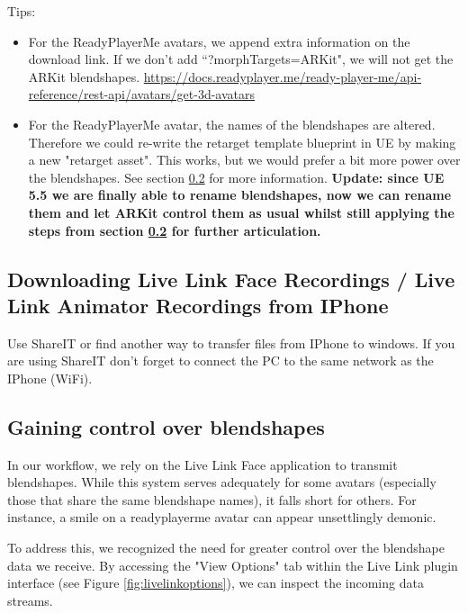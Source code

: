 \documentclass{uva-inf-article}
\begin{document}
Tips:
\begin{itemize}
    \item For the ReadyPlayerMe avatars, we append extra information on the download link. If we don't add ``?morphTargets=ARKit", we will not get the ARKit blendshapes.
    \url{https://docs.readyplayer.me/ready-player-me/api-reference/rest-api/avatars/get-3d-avatars}
    \item For the ReadyPlayerMe avatar, the names of the blendshapes are altered. Therefore we could re-write the retarget template blueprint in UE by making a new "retarget asset". This works, but we would prefer a bit more power over the blendshapes. See section \ref{blendshapescontrol} for more information. \textbf{Update: since UE 5.5 we are finally able to rename blendshapes, now we can rename them and let ARKit control them as usual whilst still applying the steps from section \ref{blendshapescontrol} for further articulation.}
\end{itemize}

\subsection{Downloading Live Link Face Recordings / Live Link Animator Recordings from IPhone}
Use ShareIT or find another way to transfer files from IPhone to windows. If you are using ShareIT don't forget to connect the PC to the same network as the IPhone (WiFi).

\subsection{Gaining control over blendshapes}\label{blendshapescontrol}
In our workflow, we rely on the Live Link Face application to transmit blendshapes. While this system serves adequately for some avatars (especially those that share the same blendshape names), it falls short for others. For instance, a smile on a readyplayerme avatar can appear unsettlingly demonic.

To address this, we recognized the need for greater control over the blendshape data we receive. By accessing the "View Options" tab within the Live Link plugin interface (see Figure \ref{fig:livelinkoptions}), we can inspect the incoming data streams.
\end{document}
